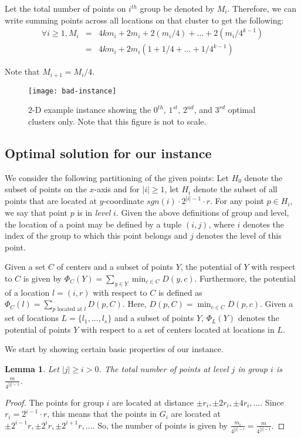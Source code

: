 \documentclass[11pt]{article}
\newtheorem{lemma}[theorem]{Lemma}
\begin{document}
Let the total number of points on $i^{th}$ group be denoted by $M_i$. 
Therefore, we can write summing points across all locations on that cluster to get the following:
\begin{eqnarray}\label{eqn:mass}
\forall i \geq 1, M_i &=& 4 k m_i  + 2m_i + 2 (m_i/4)  + ... + 2 (m_i/4^{k-1}) \nonumber \\
&=& 4 k m_i + 2 m_i (1 + 1/4 + ... + 1/4^{k-1})
\end{eqnarray}

Note that $M_{i+1}=M_i/4$.
\begin{figure}[ht]        
        \label{fig1}
        \begin{center}
                \texttt{[image: bad-instance]}
        \end{center}
        \caption{$2$-D example instance showing the $0^{th}$, $1^{st}$, $2^{nd}$, and $3^{rd}$ optimal clusters only. Note that this figure is not to scale.}
\end{figure}



\subsection{Optimal solution for our instance} 
We consider the following partitioning of the given points: 
Let $H_0$ denote the subset of points on the $x$-axis and for $|i| \geq 1$,
let $H_i$ denote the subset of all points that are located at $y$-coordinate $sgn(i) \cdot 2^{|i|-1} \cdot r$.
For any point $p \in H_i$, we say that point $p$ is in {\em level} $i$.
Given the above definitions of group and level, the location of a point may be defined by a tuple $(i, j)$, where $i$ denotes the index of the group to which this point belongs and $j$ denotes the level of this point.

Given a set $C$ of centers and a subset of points $Y$, the potential of $Y$ with respect to $C$ is given by  $\Phi_{C}(Y) = \sum_{y \in Y} \min_{c \in C} D(y, c)$. 
Furthermore, the potential of a location $l = (i, r)$ with respect to $C$ is defined as $\Phi_{C}(l) = \sum_{p \textrm{ located at } l} D(p, C)$.
Here, $D(p, C) = \min_{c \in C} D(p, c)$.
Given a set of locations $L = \{l_1, ..., l_s\}$ and a subset of points $Y$, $\Phi_{L}(Y)$ denotes the potential of points $Y$ with respect to a set of centers located at locations in $L$.

We start by showing certain basic properties of our instance.

\begin{lemma}\label{lemma:2}
Let $|j| \geq i > 0$. The total number of points  at level $j$ in group $i$ is $\frac{m}{4^{|j| - 1}}$.
\end{lemma}
\begin{proof}
The points for group $i$ are located at distance $\pm r_i, \pm 2r_i, \pm 4r_i, \ldots$.
Since $r_i = 2^{i-1} \cdot r$, this means that the points in $G_i$ are located at $\pm 2^{i-1} r, \pm 2^{i} r, \pm 2^{i+1} r, \ldots$.
So, the number of points is given by $\frac{m_i}{4^{|j|-i}} = \frac{m}{4^{|j|-1}}$.
\end{proof}
\end{document}
